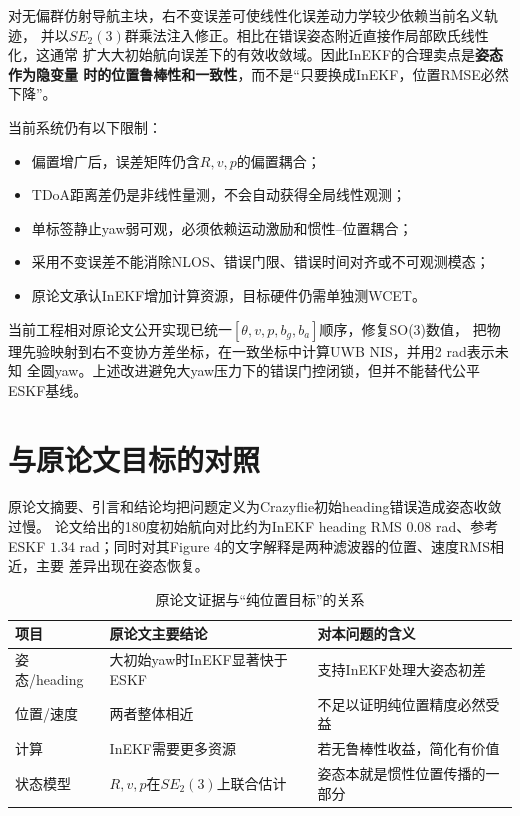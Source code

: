 \documentclass[11pt,a4paper]{ctexart}
\begin{document}
对无偏群仿射导航主块，右不变误差可使线性化误差动力学较少依赖当前名义轨迹，
并以$SE_2(3)$群乘法注入修正。相比在错误姿态附近直接作局部欧氏线性化，这通常
扩大大初始航向误差下的有效收敛域。因此InEKF的合理卖点是\textbf{姿态作为隐变量
时的位置鲁棒性和一致性}，而不是“只要换成InEKF，位置RMSE必然下降”。

当前系统仍有以下限制：
\begin{itemize}
 \item 偏置增广后，误差矩阵仍含$R,v,p$的偏置耦合；
 \item TDoA距离差仍是非线性量测，不会自动获得全局线性观测；
 \item 单标签静止yaw弱可观，必须依赖运动激励和惯性--位置耦合；
 \item 采用不变误差不能消除NLOS、错误门限、错误时间对齐或不可观测模态；
 \item 原论文承认InEKF增加计算资源，目标硬件仍需单独测WCET。
\end{itemize}

当前工程相对原论文公开实现已统一$[\theta,v,p,b_g,b_a]$顺序，修复SO(3)数值，
把物理先验映射到右不变协方差坐标，在一致坐标中计算UWB NIS，并用2 rad表示未知
全圆yaw。上述改进避免大yaw压力下的错误门控闭锁，但并不能替代公平ESKF基线。

\section{与原论文目标的对照}

原论文摘要、引言和结论均把问题定义为Crazyflie初始heading错误造成姿态收敛过慢。
论文给出的180度初始航向对比约为InEKF heading RMS $0.08$ rad、参考ESKF
$1.34$ rad；同时对其Figure 4的文字解释是两种滤波器的位置、速度RMS相近，主要
差异出现在姿态恢复。

\begin{table}[H]
\centering
\caption{原论文证据与“纯位置目标”的关系}
\begin{tabularx}{\textwidth}{p{3.0cm}X X}
\toprule
项目 & 原论文主要结论 & 对本问题的含义\\
\midrule
姿态/heading & 大初始yaw时InEKF显著快于ESKF & 支持InEKF处理大姿态初差\\
位置/速度 & 两者整体相近 & 不足以证明纯位置精度必然受益\\
计算 & InEKF需要更多资源 & 若无鲁棒性收益，简化有价值\\
状态模型 & $R,v,p$在$SE_2(3)$上联合估计 & 姿态本就是惯性位置传播的一部分\\
\bottomrule
\end{tabularx}
\end{table}
\end{document}
